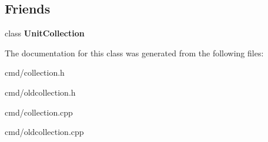 \subsection*{Friends}
\begin{DoxyCompactItemize}
\item 
class {\bfseries Unit\+Collection}\hypertarget{classUnitCollection_1_1ConstIterator_a6279c32de851a8d1507adb240445913e}{}\label{classUnitCollection_1_1ConstIterator_a6279c32de851a8d1507adb240445913e}

\end{DoxyCompactItemize}


The documentation for this class was generated from the following files\+:\begin{DoxyCompactItemize}
\item 
cmd/collection.\+h\item 
cmd/oldcollection.\+h\item 
cmd/collection.\+cpp\item 
cmd/oldcollection.\+cpp\end{DoxyCompactItemize}
